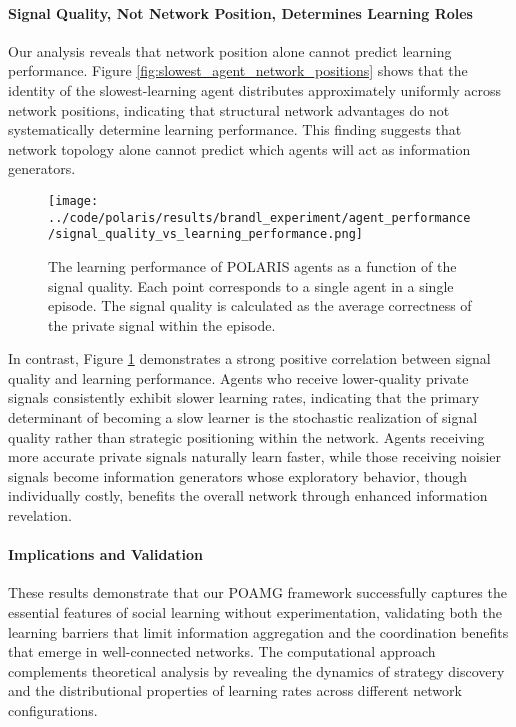 \paragraph{Signal Quality, Not Network Position, Determines Learning Roles} Our analysis reveals that network position alone cannot predict learning performance. Figure \ref{fig:slowest_agent_network_positions} shows that the identity of the slowest-learning agent distributes approximately uniformly across network positions, indicating that structural network advantages do not systematically determine learning performance. This finding suggests that network topology alone cannot predict which agents will act as information generators.

\begin{figure}[!htbp]
    \centering
    \texttt{[image: ../code/polaris/results/brandl\_experiment/agent\_performance/signal\_quality\_vs\_learning\_performance.png]}
    \caption{The learning performance of POLARIS agents as a function of the signal quality. Each point corresponds to a single agent in a single episode. The signal quality is calculated as the average correctness of the private signal within the episode.}
    \label{fig:signal_quality_vs_learning_performance}
\end{figure}

In contrast, Figure \ref{fig:signal_quality_vs_learning_performance} demonstrates a strong positive correlation between signal quality and learning performance. Agents who receive lower-quality private signals consistently exhibit slower learning rates, indicating that the primary determinant of becoming a slow learner is the stochastic realization of signal quality rather than strategic positioning within the network. Agents receiving more accurate private signals naturally learn faster, while those receiving noisier signals become information generators whose exploratory behavior, though individually costly, benefits the overall network through enhanced information revelation.

\paragraph{Implications and Validation} These results demonstrate that our POAMG framework successfully captures the essential features of social learning without experimentation, validating both the learning barriers that limit information aggregation and the coordination benefits that emerge in well-connected networks. The computational approach complements theoretical analysis by revealing the dynamics of strategy discovery and the distributional properties of learning rates across different network configurations.


